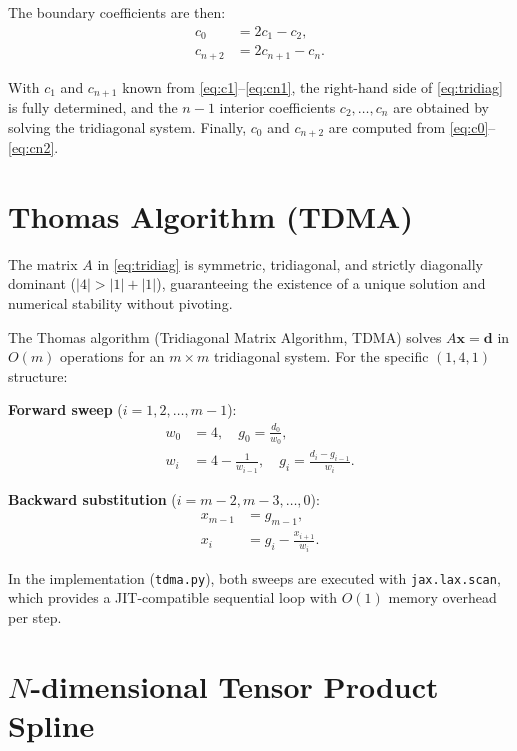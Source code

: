 \documentclass[11pt,a4paper]{article}
\begin{document}
The boundary coefficients are then:
\begin{align}
  c_0     &= 2c_1 - c_2,     \label{eq:c0} \\
  c_{n+2} &= 2c_{n+1} - c_n. \label{eq:cn2}
\end{align}

With $c_1$ and $c_{n+1}$ known from \eqref{eq:c1}--\eqref{eq:cn1}, the
right-hand side of \eqref{eq:tridiag} is fully determined, and the
$n - 1$ interior coefficients $c_2, \ldots, c_n$ are obtained by solving
the tridiagonal system. Finally, $c_0$ and $c_{n+2}$ are computed from
\eqref{eq:c0}--\eqref{eq:cn2}.

\section{Thomas Algorithm (TDMA)}

The matrix $A$ in \eqref{eq:tridiag} is symmetric, tridiagonal, and
strictly diagonally dominant ($|4| > |1| + |1|$), guaranteeing the
existence of a unique solution and numerical stability without pivoting.

The Thomas algorithm (Tridiagonal Matrix Algorithm, TDMA) solves
$A\mathbf{x} = \mathbf{d}$ in $O(m)$ operations for an
$m \times m$ tridiagonal system. For the specific $(1, 4, 1)$ structure:

\textbf{Forward sweep} ($i = 1, 2, \ldots, m - 1$):
\begin{align}
  w_0 &= 4, \quad g_0 = \frac{d_0}{w_0}, \label{eq:fwd-init} \\
  w_i &= 4 - \frac{1}{w_{i-1}}, \quad g_i = \frac{d_i - g_{i-1}}{w_i}. \label{eq:fwd-step}
\end{align}

\textbf{Backward substitution} ($i = m - 2, m - 3, \ldots, 0$):
\begin{align}
  x_{m-1} &= g_{m-1}, \label{eq:bwd-init} \\
  x_i     &= g_i - \frac{x_{i+1}}{w_i}. \label{eq:bwd-step}
\end{align}

In the implementation (\texttt{tdma.py}), both sweeps are executed with
\texttt{jax.lax.scan}, which provides a JIT-compatible sequential loop
with $O(1)$ memory overhead per step.

\section{$N$-dimensional Tensor Product Spline}
\end{document}
